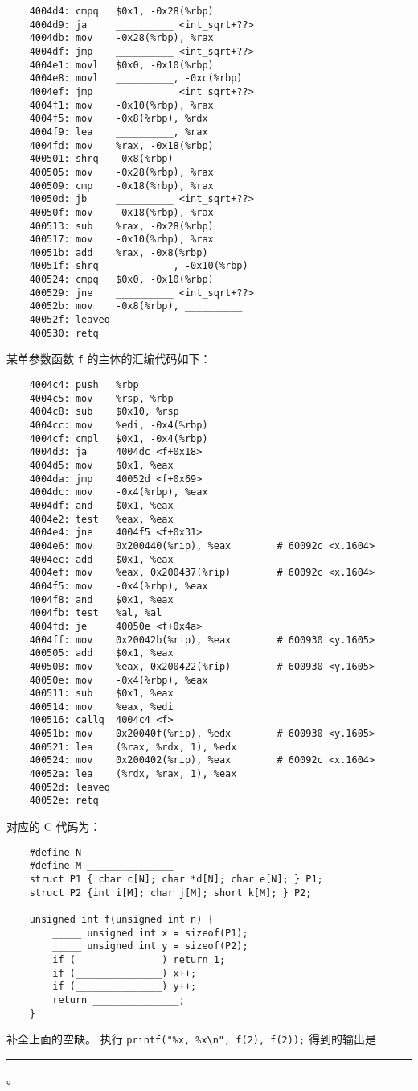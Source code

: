 \begin{problems}
\begin{verbatim}
    4004d4: cmpq   $0x1, -0x28(%rbp)
    4004d9: ja     __________ <int_sqrt+??>
    4004db: mov    -0x28(%rbp), %rax
    4004df: jmp    __________ <int_sqrt+??>
    4004e1: movl   $0x0, -0x10(%rbp)
    4004e8: movl   __________, -0xc(%rbp)
    4004ef: jmp    __________ <int_sqrt+??>
    4004f1: mov    -0x10(%rbp), %rax
    4004f5: mov    -0x8(%rbp), %rdx
    4004f9: lea    __________, %rax
    4004fd: mov    %rax, -0x18(%rbp)
    400501: shrq   -0x8(%rbp)
    400505: mov    -0x28(%rbp), %rax
    400509: cmp    -0x18(%rbp), %rax
    40050d: jb     __________ <int_sqrt+??>
    40050f: mov    -0x18(%rbp), %rax
    400513: sub    %rax, -0x28(%rbp)
    400517: mov    -0x10(%rbp), %rax
    40051b: add    %rax, -0x8(%rbp)
    40051f: shrq   __________, -0x10(%rbp)
    400524: cmpq   $0x0, -0x10(%rbp)
    400529: jne    __________ <int_sqrt+??>
    40052b: mov    -0x8(%rbp), __________
    40052f: leaveq
    400530: retq
        \end{verbatim}
         某单参数函数 \verb|f| 的主体的汇编代码如下：
        \begin{verbatim}
    4004c4: push   %rbp
    4004c5: mov    %rsp, %rbp
    4004c8: sub    $0x10, %rsp
    4004cc: mov    %edi, -0x4(%rbp)
    4004cf: cmpl   $0x1, -0x4(%rbp)
    4004d3: ja     4004dc <f+0x18>
    4004d5: mov    $0x1, %eax
    4004da: jmp    40052d <f+0x69>
    4004dc: mov    -0x4(%rbp), %eax
    4004df: and    $0x1, %eax
    4004e2: test   %eax, %eax
    4004e4: jne    4004f5 <f+0x31>
    4004e6: mov    0x200440(%rip), %eax        # 60092c <x.1604>
    4004ec: add    $0x1, %eax
    4004ef: mov    %eax, 0x200437(%rip)        # 60092c <x.1604>
    4004f5: mov    -0x4(%rbp), %eax
    4004f8: and    $0x1, %eax
    4004fb: test   %al, %al
    4004fd: je     40050e <f+0x4a>
    4004ff: mov    0x20042b(%rip), %eax        # 600930 <y.1605>
    400505: add    $0x1, %eax
    400508: mov    %eax, 0x200422(%rip)        # 600930 <y.1605>
    40050e: mov    -0x4(%rbp), %eax
    400511: sub    $0x1, %eax
    400514: mov    %eax, %edi
    400516: callq  4004c4 <f>
    40051b: mov    0x20040f(%rip), %edx        # 600930 <y.1605>
    400521: lea    (%rax, %rdx, 1), %edx
    400524: mov    0x200402(%rip), %eax        # 60092c <x.1604>
    40052a: lea    (%rdx, %rax, 1), %eax
    40052d: leaveq
    40052e: retq
        \end{verbatim}
        对应的 C 代码为：
        \begin{verbatim}
    #define N _______________
    #define M _______________
    struct P1 { char c[N]; char *d[N]; char e[N]; } P1;
    struct P2 {int i[M]; char j[M]; short k[M]; } P2;
 
    unsigned int f(unsigned int n) {
        _____ unsigned int x = sizeof(P1);
        _____ unsigned int y = sizeof(P2);
        if (_______________) return 1;
        if (_______________) x++;
        if (_______________) y++;
        return _______________;
    }
        \end{verbatim}
        \qn 补全上面的空缺。
        \qn 执行 \verb|printf("%x, %x\n", f(2), f(2));| 得到的输出是 \rule{2.5cm}{0.25mm}。
    \end{problems}